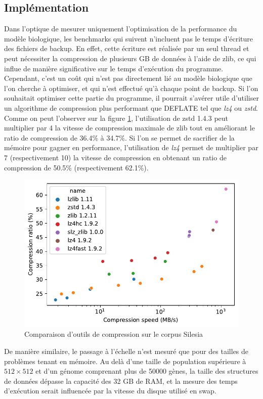 \documentclass[a4paper, 10pt, twoside]{article}
\begin{document}
\subsection{Implémentation}

Dans l'optique de mesurer uniquement l'optimisation de la performance du modèle biologique, les benchmarks qui suivent n'incluent pas le temps d'écriture des fichiers de backup. En effet, cette écriture est réalisée par un seul thread et peut nécessiter la compression de plusieurs GB de données à l'aide de zlib, ce qui influe de manière significative sur le temps d'exécution du programme. Cependant, c'est un coût qui n'est pas directement lié au modèle biologique que l'on cherche à optimiser, et qui n'est effectué qu'à chaque point de backup. Si l'on souhaitait optimiser cette partie du programme, il pourrait s'avérer utile d'utiliser un algorithme de compression plus performant que DEFLATE tel que \textit{lz4} ou \textit{zstd}. Comme on peut l'observer sur la figure \ref{fig:compression/tools}, l'utilisation de zstd 1.4.3 peut multiplier par 4 la vitesse de compression maximale de zlib tout en améliorant le ratio de compression de 36.4\% à 34.7\%. Si l'on se permet de sacrifier de la mémoire pour gagner en performance, l'utilisation de \textit{lz4} permet de multiplier par 7 (respectivement 10) la vitesse de compression en obtenant un ratio de compression de 50.5\% (respectivement 62.1\%).

\begin{figure}[htb]
	\centering
	\includegraphics[width=0.5\linewidth]{img/compression_tools.pdf}
	\caption{Comparaison d'outils de compression sur le corpus Silesia \cite{lzbench}}
	\label{fig:compression/tools}
\end{figure}

De manière similaire, le passage à l'échelle n'est mesuré que pour des tailles de problèmes tenant en mémoire. Au delà d'une taille de population supérieure à $512 \times 512$ et d'un génome comprenant plus de 50000 gènes, la taille des structures de données dépasse la capacité des 32 GB de RAM, et la mesure des temps d'exécution serait influencée par la vitesse du disque utilisé en swap.
\end{document}
